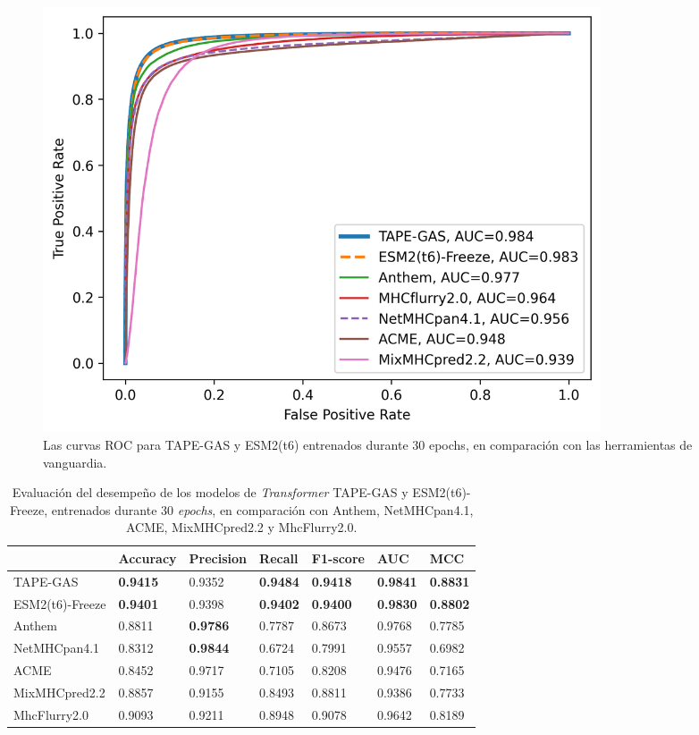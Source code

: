 \begin{figure}
	\centering
	\includegraphics[width=0.8\textwidth]{img/results/ROC_comparison}
	\caption[Comparación de ROC con métodos del estado del arte]{Las curvas ROC para TAPE-GAS y ESM2(t6) entrenados durante 30 epochs, en comparación con las herramientas de vanguardia.}
	\label{fig:ROC_comparison_final}
\end{figure}

\begin{table}[]
	\centering
	\caption{Evaluación del desempeño de los modelos de \textit{Transformer} TAPE-GAS y ESM2(t6)-Freeze, entrenados durante 30 \textit{epochs}, en comparación con Anthem, NetMHCpan4.1, ACME, MixMHCpred2.2 y MhcFlurry2.0.}
	\label{tab:final_comparison}
	\footnotesize
	\setlength{\tabcolsep}{0.5em} %
	{\renewcommand{\arraystretch}{1.5}%
	\begin{tabular}{lllllll}
		& \textbf{Accuracy} & \textbf{Precision} & \textbf{Recall} & \textbf{F1-score} & \textbf{AUC}    & \textbf{MCC}    \\ \midrule
		TAPE-GAS        & \textbf{0.9415}   & 0.9352             & \textbf{0.9484} & \textbf{0.9418}   & \textbf{0.9841} & \textbf{0.8831} \\
		ESM2(t6)-Freeze & \textbf{0.9401}   & 0.9398             & \textbf{0.9402} & \textbf{0.9400}   & \textbf{0.9830} & \textbf{0.8802} \\
		
		Anthem          & 0.8811            & \textbf{0.9786}    & 0.7787          & 0.8673            & 0.9768          & 0.7785          \\
		NetMHCpan4.1    & 0.8312            & \textbf{0.9844}    & 0.6724          & 0.7991            & 0.9557          & 0.6982          \\
		
		ACME            & 0.8452            & 0.9717             & 0.7105          & 0.8208            & 0.9476          & 0.7165          \\
		MixMHCpred2.2   & 0.8857            & 0.9155             & 0.8493          & 0.8811            & 0.9386          & 0.7733          \\
		MhcFlurry2.0    & 0.9093            & 0.9211             & 0.8948          & 0.9078            & 0.9642          & 0.8189 \\         
	\end{tabular}}
\end{table}

